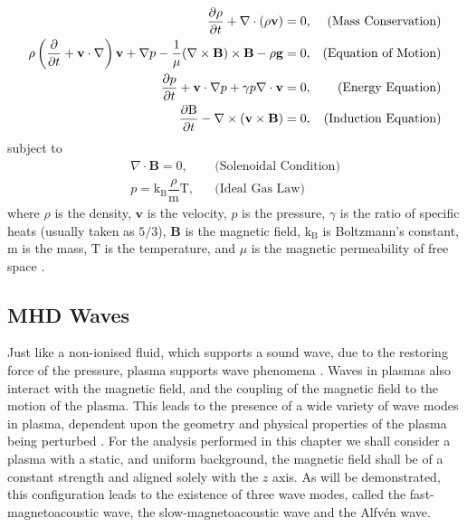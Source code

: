 \documentclass[a4paper,12pt,fourier,authoryear,custommargin]{Classes/PhDThesisPSnPDF}
\renewcommand{\vec}{\mathbf}
\begin{document}
\begin{align}                                                  
    \dfrac{\partial \rho }{\partial t} + \nabla \cdot (\rho \vec{v}) = 0,
    &&\text{(Mass Conservation)}\label{eq:imhd_mass}\\
    \rho  \condev\vec{v} + \nabla p - \dfrac{1}{\mu}(\nabla \times \vec{B}) \times \vec{B} - \rho \vec{g} = 0,
    &&\text{(Equation of Motion)}\label{eq:imhd_motion}\\
    \frac{\partial p}{\partial t} + \vec{v}\cdot\nabla p + \gamma p \nabla \cdot \vec{v}  = 0,
    &&\text{(Energy Equation)}\label{eq:imhd_equation}\\
    \dfrac{\partial \mathrm{B}}{\partial t} - \nabla \times (\vec{v} \times \vec{B}) = 0,
    &&\text{(Induction Equation)}\label{eq:imhd_induction}
\end{align}
subject to
\begin{align}
    \nabla \cdot \vec{B} = 0,
    &&\text{(Solenoidal Condition)}\\
    p = \mathrm{k_B} \dfrac{\rho}{\mathrm{m}} \mathrm{T},
    &&\text{(Ideal Gas Law)}                    
\end{align}
where $\rho$ is the density, $\vec{v}$ is the velocity, $p$ is the pressure, $\gamma$ is the ratio of specific heats (usually taken as $5/3$), $\vec{B}$ is the magnetic field, $\mathrm{k_B}$ is Boltzmann's constant, $\mathrm{m}$ is the mass, $\mathrm{T}$ is the temperature, and $\mu$ is the magnetic permeability of free space \citep{goedbloed2004}.


\subsection{MHD Waves}\label{sec:MHDwaves}
Just like a non-ionised fluid, which supports a sound wave, due to the restoring force of the pressure, plasma supports wave phenomena \citep{alfven1942}.
Waves in plasmas also interact with the magnetic field, and the coupling of the magnetic field to the motion of the plasma.
This leads to the presence of a wide variety of wave modes in plasma, dependent upon the geometry and physical properties of the plasma being perturbed \citep{jess2015}.
For the analysis performed in this chapter we shall consider a plasma with a static, and uniform background, the magnetic field shall be of a constant strength and aligned solely with the $z$ axis.
As will be demonstrated, this configuration leads to the existence of three wave modes, called the fast-magnetoacoustic wave, the slow-magnetoacoustic wave and the Alfv\'en wave.
\end{document}
